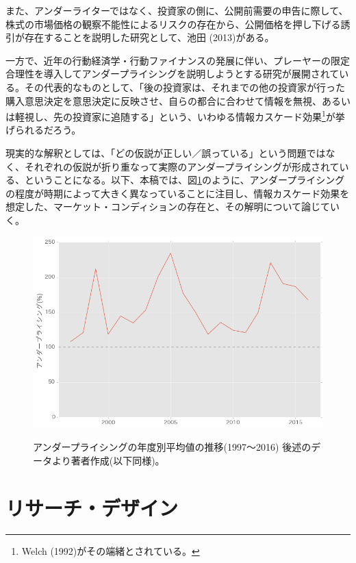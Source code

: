 \documentclass{jsarticle}
\begin{document}
また、アンダーライターではなく、投資家の側に、公開前需要の申告に際して、株式の市場価格の観察不能性によるリスクの存在から、公開価格を押し下げる誘引が存在することを説明した研究として、池田 (2013)\cite{ikeda}がある。\\ \par

一方で、近年の行動経済学・行動ファイナンスの発展に伴い、プレーヤーの限定合理性を導入してアンダープライシングを説明しようとする研究が展開されている。その代表的なものとして、「後の投資家は、それまでの他の投資家が行った購入意思決定を意思決定に反映させ、自らの都合に合わせて情報を無視、あるいは軽視し、先の投資家に追随する」という、いわゆる情報カスケード効果\footnote[6]{Welch (1992)\cite{Welch}がその端緒とされている。}が挙げられるだろう。\par




現実的な解釈としては、「どの仮説が正しい／誤っている」という問題ではなく、それぞれの仮説が折り重なって実際のアンダープライシングが形成されている、ということになる。以下、本稿では、図\ref{transition}のように、アンダープライシングの程度が時期によって大きく異なっていることに注目し、情報カスケード効果を想定した、マーケット・コンディションの存在と、その解明について論じていく。

\begin{figure}[h]
  \begin{center}
  \caption{アンダープライシングの年度別平均値の推移(1997〜2016) 後述のデータより著者作成(以下同様)。}
    \includegraphics[clip,width=14cm]{./transition.png}
    \label{transition}
  \end{center}
\end{figure}


\section{リサーチ・デザイン}
\end{document}
